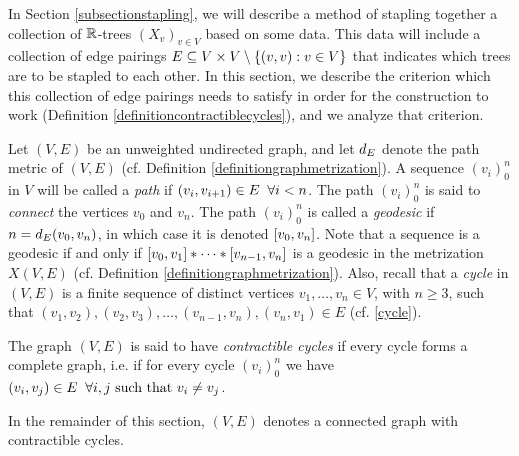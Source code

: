 In Section \ref{subsectionstapling}, we will describe a method of stapling together a collection of $\R$-trees $(X_v)_{v\in V}$ based on some data. This data will include a collection of edge pairings $E\subseteq V\times V\setminus\{(v,v) : v\in V\}$ that indicates which trees are to be stapled to each other. In this section, we describe the criterion which this collection of edge pairings needs to satisfy in order for the construction to work (Definition \ref{definitioncontractiblecycles}), and we analyze that criterion.

Let $(V,E)$ be an unweighted undirected graph, and let $d_E$ denote the path metric of $(V,E)$ (cf. Definition \ref{definitiongraphmetrization}). A sequence $(v_i)_0^n$ in $V$ will be called a \emph{path} if $(v_i,v_{i + 1})\in E\;\;\forall i < n$. The path $(v_i)_0^n$ is said to \emph{connect} the vertices $v_0$ and $v_n$. The path $(v_i)_0^n$ is called a \emph{geodesic} if $n = d_E(v_0,v_n)$, in which case it is denoted $[v_0,v_n]$. Note that a sequence is a geodesic if and only if $[v_0,v_1]\ast\cdots\ast[v_{n - 1},v_n]$ is a geodesic in the metrization $X(V,E)$ (cf. Definition \ref{definitiongraphmetrization}). Also, recall that a \emph{cycle} in $(V,E)$ is a finite sequence of distinct vertices $v_1,\ldots,v_n\in V$, with $n\geq 3$, such that $(v_1,v_2), (v_2,v_3), \ldots, (v_{n - 1},v_n), (v_n,v_1)\in E$ (cf. \eqref{cycle}).

\begin{definition}
\label{definitioncontractiblecycles}
The graph $(V,E)$ is said to have \emph{contractible cycles} if every cycle forms a complete graph, i.e. if for every cycle $(v_i)_0^n$ we have $(v_i,v_j)\in E \;\;\forall i,j \textup{ such that $v_i\neq v_j$}$.
\end{definition}

\begin{standingassumption}
In the remainder of this section, $(V,E)$ denotes a connected graph with contractible cycles.
\end{standingassumption}




